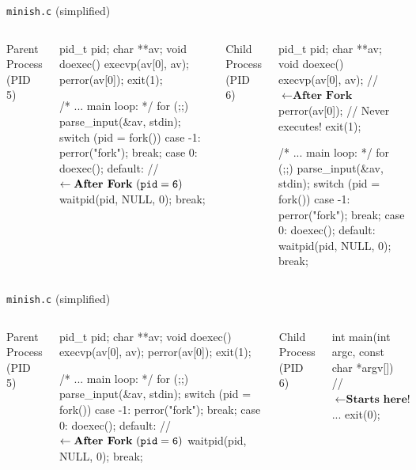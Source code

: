 \documentclass[11pt,aspectratio=169]{beamer}
\begin{document}
\begin{slide}{\texttt{minish.c} (simplified)}
\begin{columns}
Parent Process (PID 5)
\begin{smallccode}[mathescape=true,numbers=left]
pid_t pid; char **av;
void doexec() {
  execvp(av[0], av);
  perror(av[0]);
  exit(1);
}    

    /* ... main loop: */
    for (;;) {
      parse_input(&av, stdin);
      switch (pid = fork()) {
      case -1:
	perror("fork"); break;
      case 0:
	doexec();
      default: // $\leftarrow \textbf{After Fork}~({\tt pid = 6})$
	waitpid(pid, NULL, 0); break;
      }
    }
\end{smallccode}
Child Process (PID 6)
    \begin{smallccode}[mathescape=true]
pid_t pid; char **av;
void doexec() {
  execvp(av[0], av); // $\leftarrow \textbf{After Fork}$
  perror(av[0]); // Never executes!
  exit(1);
}

    /* ... main loop: */
    for (;;) {
      parse_input(&av, stdin);
      switch (pid = fork()) {
      case -1:
	perror("fork"); break;
      case 0:
	doexec();
      default:
	waitpid(pid, NULL, 0); break;
      }
    }
\end{smallccode}
\end{columns}
\end{slide}

\begin{slide}{\texttt{minish.c} (simplified)}
\begin{columns}
Parent Process (PID 5)
\begin{smallccode}[mathescape=true,numbers=left]
pid_t pid; char **av;
void doexec() {
  execvp(av[0], av);
  perror(av[0]);
  exit(1);
}    

    /* ... main loop: */
    for (;;) {
      parse_input(&av, stdin);
      switch (pid = fork()) {
      case -1:
	perror("fork"); break;
      case 0:
	doexec();
      default: // $\leftarrow \textbf{After Fork}~({\tt pid = 6})$
	waitpid(pid, NULL, 0); break;
      }
    }
\end{smallccode}
Child Process (PID 6)
\begin{smallccode}[mathescape=true]

int
main(int argc, const char *argv[])
{
  // $\leftarrow \textbf{Starts here!}$
  ...
  exit(0);
}
\end{smallccode}
\end{columns}
\end{slide}
\end{document}
